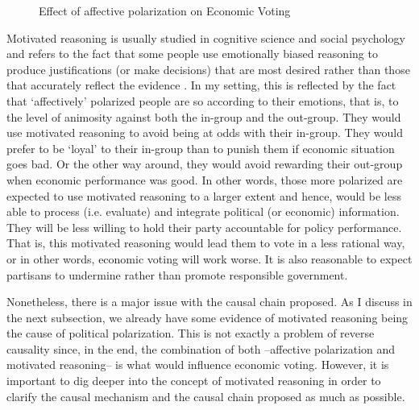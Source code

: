 \documentclass[a4paper, svgnames]{article}
\begin{document}
\begin{figure}[H]
\centering
{}
\caption{\label{fig:model} Effect of affective polarization on Economic Voting}
\end{figure}

Motivated reasoning is usually studied in cognitive science and social psychology and refers to the fact that some people use emotionally biased reasoning to produce justifications (or make decisions) that are most desired rather than those that accurately reflect the evidence \citep{Kunda1990}. In my setting, this is reflected by the fact that `affectively' polarized people are so according to their emotions, that is, to the level of animosity against both the in-group and the out-group. They would use motivated reasoning to avoid being at odds with their in-group. They would prefer to be `loyal' to their in-group than to punish them if economic situation goes bad. Or the other way around, they would avoid rewarding their out-group when economic performance was good. In other words, those more polarized are expected to use motivated reasoning to a larger extent and hence, would be less able to process (i.e. evaluate) and integrate political (or economic) information. They will be less willing to hold their party accountable for policy performance. That is, this motivated reasoning would lead them to vote in a less rational way, or in other words, economic voting will work worse. It is also reasonable to expect partisans to undermine rather than promote responsible government. 

Nonetheless, there is a major issue with the causal chain proposed. As I discuss in the next subsection, we already have some evidence of motivated reasoning being the cause of political polarization. This is not exactly a problem of reverse causality since, in the end, the combination of both --affective polarization and motivated reasoning-- is what would influence economic voting. However, it is important to dig deeper into the concept of motivated reasoning in order to clarify the causal mechanism and the causal chain proposed as much as possible.
\end{document}
